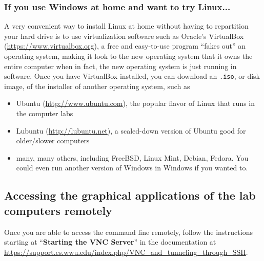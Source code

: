 \documentclass[12pt]{article}
\begin{document}
\subsubsection{If you use Windows at home and want to try Linux...}
A very convenient way to install Linux at home without having to repartition your hard drive is to use virtualization software such as Oracle's VirtualBox (\url{https://www.virtualbox.org}), a free and easy-to-use program ``fakes out'' an operating system, making it look to the new operating system that it owns the entire computer when in fact, the new operating system is just running in software.  Once you have VirtualBox installed, you can download an \verb|.iso|, or disk image, of the installer of another operating system, such as
\begin{itemize}
	\item Ubuntu (\url{http://www.ubuntu.com}), the popular flavor of Linux that runs in the computer labs
	\item Lubuntu (\url{http://lubuntu.net}), a scaled-down version of Ubuntu good for older/slower computers
	\item many, many others, including FreeBSD, Linux Mint, Debian, Fedora.  You could even run another version of Windows in Windows if you wanted to.
\end{itemize}

\subsection{Accessing the graphical applications of the lab computers remotely}
Once you are able to access the command line remotely, follow the instructions starting at ``\textbf{Starting the VNC Server}'' in the documentation at \url{https://support.cs.wwu.edu/index.php/VNC_and_tunneling_through_SSH}.
\end{document}
